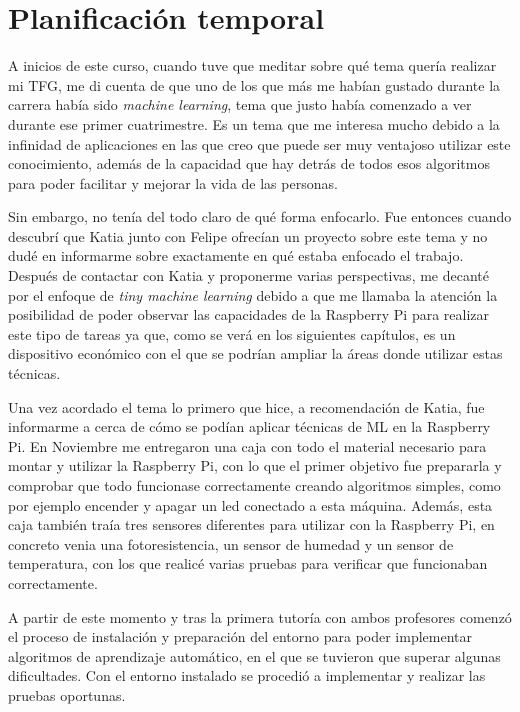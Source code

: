 \documentclass[a4paper, 12pt]{book}
\begin{document}
\section{Planificación temporal}
\label{sec:planificacion-temporal}

A inicios de este curso, cuando tuve que meditar sobre qué tema quería realizar mi TFG, me di cuenta de que uno de los que más me habían gustado durante la carrera había sido \textit{machine learning}, tema que justo había comenzado a ver durante ese primer cuatrimestre. Es un tema que me interesa mucho debido a la infinidad de aplicaciones en las que creo que puede ser muy ventajoso utilizar este conocimiento, además de la capacidad que hay detrás de todos esos algoritmos para poder facilitar y mejorar la vida de las personas.

Sin embargo, no tenía del todo claro de qué forma enfocarlo. Fue entonces cuando descubrí que Katia junto con Felipe ofrecían un proyecto sobre este tema y no dudé en informarme sobre exactamente en qué estaba enfocado el trabajo. Después de contactar con Katia y proponerme varias perspectivas, me decanté por el enfoque de \textit{tiny machine learning} debido a que me llamaba la atención la posibilidad de poder observar las capacidades de la Raspberry Pi para realizar este tipo de tareas ya que, como se verá en los siguientes capítulos, es un dispositivo económico con el que se podrían ampliar la áreas donde utilizar estas técnicas.

Una vez acordado el tema lo primero que hice, a recomendación de Katia, fue informarme a cerca de cómo se podían aplicar técnicas de ML en la Raspberry Pi. En Noviembre me entregaron una caja con todo el material necesario para montar y utilizar la Raspberry Pi, con lo que el primer objetivo fue prepararla y comprobar que todo funcionase correctamente creando algoritmos simples, como por ejemplo encender y apagar un led conectado a esta máquina. Además, esta caja también traía tres sensores diferentes para utilizar con la Raspberry Pi, en concreto venia una fotoresistencia, un sensor de humedad y un sensor de temperatura, con los que realicé varias pruebas para verificar que funcionaban correctamente.

A partir de este momento y tras la primera tutoría con ambos profesores comenzó el proceso de instalación y preparación del entorno para poder implementar algoritmos de aprendizaje automático, en el que se tuvieron que superar algunas dificultades. Con el entorno instalado se procedió a implementar y realizar las pruebas oportunas.
\end{document}
